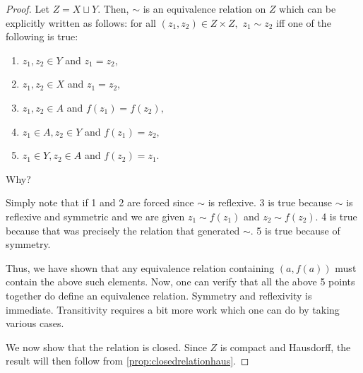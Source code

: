 \documentclass[12pt]{article}
\newenvironment{blockquote}
{\begin{mdframed}[skipabove=0pt, skipbelow=0pt, innertopmargin=4pt, innerbottommargin=4pt, bottomline=false,topline=false,rightline=false, linewidth=2pt]}
{\end{mdframed}}
\begin{document}
\begin{proof} 
	Let $Z = X \sqcup Y.$ 
	Then, $\sim$ is an equivalence relation on $Z$ which can be explicitly written as follows: for all $(z_1, z_2) \in Z \times Z,$ $z_1 \sim z_2$ iff one of the following is true:
	\begin{enumerate}
		\item $z_1, z_2 \in Y$ and $z_1 = z_2,$
		\item $z_1, z_2 \in X$ and $z_1 = z_2,$
		\item $z_1, z_2 \in A$ and $f(z_1) = f(z_2),$
		\item $z_1 \in A, z_2 \in Y$ and $f(z_1) = z_2,$
		\item $z_1 \in Y, z_2 \in A$ and $f(z_2) = z_1.$
	\end{enumerate}

	\begin{blockquote}
		Why?

		Simply note that if 1 and 2 are forced since $\sim$ is reflexive. 3 is true because $\sim$ is reflexive and symmetric and we are given $z_1 \sim f(z_1)$ and $z_2 \sim f(z_2).$ 4 is true because that was precisely the relation that generated $\sim.$ 5 is true because of symmetry.

		Thus, we have shown that any equivalence relation containing $(a, f(a))$ must contain the above such elements. Now, one can verify that all the above 5 points together do define an equivalence relation. Symmetry and reflexivity is immediate. Transitivity requires a bit more work which one can do by taking various cases.
	\end{blockquote}

	We now show that the relation is closed. Since $Z$ is compact and Hausdorff, the result will then follow from \cref{prop:closedrelationhaus}.


\end{proof}
\end{document}
